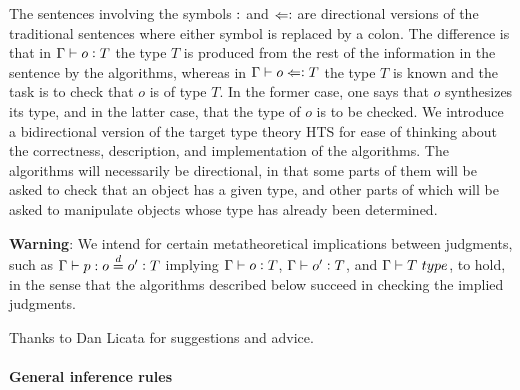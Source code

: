 \documentclass[11pt]{article}
\newcommand{\eqd}{\stackrel{d}{=}}
\newcommand{\synth}{\vcentcolon} %
\newcommand{\ccheck}{\Leftarrow\vcentcolon}
\newcommand{\Type}{\mathop{{\, \sc type}}}
\begin{document}
The sentences involving the symbols $\synth$ and $\ccheck$ are directional
versions of the traditional sentences where either symbol is replaced by a
colon.  The difference is that in $\Gamma\vdash o \synth T$ the type $T$ is
produced from the rest of the information in the sentence by the algorithms,
whereas in $\Gamma\vdash o \ccheck T$ the type $T$ is known and the task is to
check that $o$ is of type $T$.  In the former case, one says that $o$
synthesizes its type, and in the latter case, that the type of $o$ is to be
checked.  We introduce a bidirectional version of the target type theory HTS
for ease of thinking about the correctness, description, and implementation of
the algorithms.  The algorithms will necessarily be directional, in that some
parts of them will be asked to check that an object has a given type, and other
parts of which will be asked to manipulate objects whose type has already been
determined.

{\bf Warning}: We intend for certain metatheoretical implications between
judgments, such as $\Gamma \vdash p : o \eqd o' \synth T$ implying $\Gamma
\vdash o \synth T$, $\Gamma \vdash o' \synth T$, and $\Gamma \vdash T \Type$,
to hold, in the sense that the algorithms described below succeed in checking
the implied judgments.

Thanks to Dan Licata for suggestions and advice.

\paragraph{General inference rules} 
\end{document}
